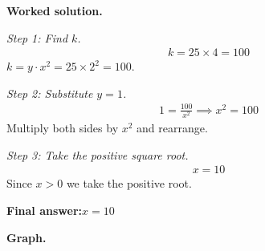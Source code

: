 \documentclass[11pt]{article}
\begin{document}
\textbf{Worked solution.}

\textit{Step 1: Find \( k \).}
\[\begin{gathered}
k = 25 \times 4 = 100
\end{gathered}\]
\( k = y \cdot x^2 = 25 \times 2^2 = 100 \).

\textit{Step 2: Substitute \( y = 1 \).}
\[\begin{gathered}
1 = \frac{100}{x^2} \implies x^2 = 100
\end{gathered}\]
Multiply both sides by \( x^2 \) and rearrange.

\textit{Step 3: Take the positive square root.}
\[\begin{gathered}
x = 10
\end{gathered}\]
Since \( x > 0 \) we take the positive root.

\begin{answerbox}
\textbf{Final answer:}\quad \(\displaystyle  x = 10 \)
\end{answerbox}
\textbf{Graph.}
\end{document}

